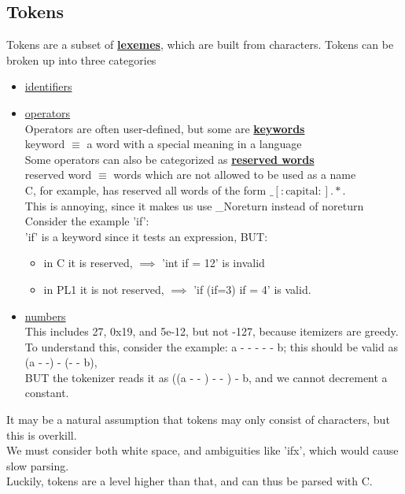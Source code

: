 \documentclass[../../lecture_notes.tex]{subfiles}
\begin{document}
\subsection*{Tokens}
Tokens are a subset of \textbf{\underline{lexemes}}, which are built from characters.
Tokens can be broken up into three categories \begin{itemize}[itemsep=0mm]
	\item \underline{identifiers} 
	\item \underline{operators} \\
		Operators are often user-defined, but some are \textbf{\underline{keywords}}\\
		\indent keyword $\equiv$ a word with a special meaning in a language\\
		Some operators can also be categorized as \textbf{\underline{reserved words}}\\
		\indent reserved word $\equiv$ words which are not allowed to be used as a name\\
		C, for example, has reserved all words of the form $\_[:\mbox{capital}:].*$.\\
		This is annoying, since it makes us use \_Noreturn instead of noreturn
		Consider the example 'if':\\
			'if' is a keyword since it tests an expression, BUT: \begin{itemize}[itemsep=0mm]
			\item in C it is reserved, $\implies$ 'int if = 12' is invalid\\
			\item in PL1 it is not reserved, $\implies$ 'if (if=3) if = 4' is valid.
			\end{itemize}
	\item \underline{numbers} \\
		This includes 27, 0x19, and 5e-12, but not -127, because itemizers are greedy.\\
		To understand this, consider the example: a - - - - - b; this should be valid as (a - -) - (- - b), 
		\\ BUT the tokenizer reads it as ((a - - ) - - ) - b, and we cannot decrement a constant.
\end{itemize}
It may be a natural assumption that tokens may only consist of characters, but this is overkill.\\
We must consider both white space, and ambiguities like 'ifx', which would cause slow parsing.\\
Luckily, tokens are a level higher than that, and can thus be parsed with C.
\end{document}
